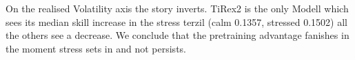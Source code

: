 On the realised Volatility axis the story inverts. TiRex2 is the only Modell which sees its median skill increase in the stress terzil (calm 0.1357, stressed 0.1502) all the others see a decrease. We conclude that the pretraining advantage fanishes in the moment stress sets in and not persists.
%

